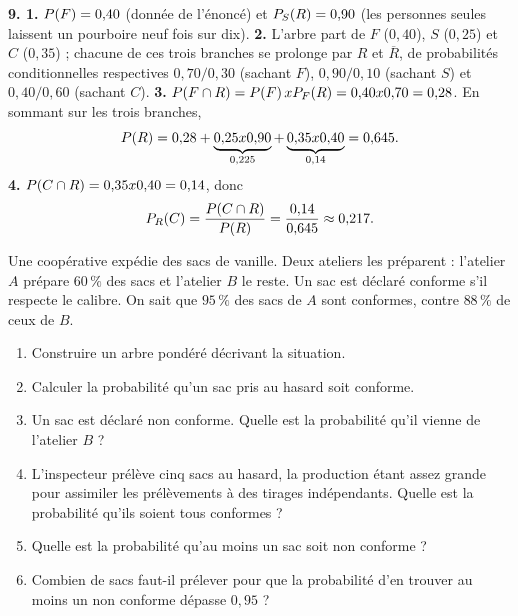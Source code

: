 \begin{corrige}[annales]
\textbf{9. 1.} $\proba{F} = 0{,}40$ (donnée de l'énoncé) et
$\probacond{R}{S} = 0{,}90$ (les personnes seules laissent un pourboire neuf
fois sur dix).
\textbf{2.} L'arbre part de $F$ ($0{,}40$), $S$ ($0{,}25$) et $C$ ($0{,}35$) ;
chacune de ces trois branches se prolonge par $R$ et $\overline{R}$, de
probabilités conditionnelles respectives $0{,}70/0{,}30$ (sachant $F$),
$0{,}90/0{,}10$ (sachant $S$) et $0{,}40/0{,}60$ (sachant $C$).
\textbf{3.} $\proba{F\cap R} = \proba{F}\times\probacond{R}{F}
= 0{,}40\times0{,}70 = 0{,}28$. En sommant sur les trois branches,
\[
  \proba{R} = 0{,}28 + \underbrace{0{,}25\times0{,}90}_{0{,}225}
  + \underbrace{0{,}35\times0{,}40}_{0{,}14} = 0{,}645 .
\]
\textbf{4.} $\proba{C\cap R} = 0{,}35\times0{,}40 = 0{,}14$, donc
\[
  \probacond{C}{R} = \frac{\proba{C\cap R}}{\proba{R}}
  = \frac{0{,}14}{0{,}645} \approx 0{,}217 .
\]
\end{corrige}

\begin{jecherche}
Une coopérative expédie des sacs de vanille. Deux ateliers les préparent :
l'atelier $A$ prépare $60\,\%$ des sacs et l'atelier $B$ le reste. Un sac est
déclaré conforme s'il respecte le calibre. On sait que $95\,\%$ des sacs de
$A$ sont conformes, contre $88\,\%$ de ceux de $B$.

\begin{enumerate}[label=\textbf{\arabic*.}, leftmargin=*, itemsep=0.3em]
  \item Construire un arbre pondéré décrivant la situation.
  \item Calculer la probabilité qu'un sac pris au hasard soit conforme.
  \item Un sac est déclaré non conforme. Quelle est la probabilité qu'il
        vienne de l'atelier $B$ ?
  \item L'inspecteur prélève cinq sacs au hasard, la production étant assez
        grande pour assimiler les prélèvements à des tirages indépendants.
        Quelle est la probabilité qu'ils soient tous conformes ?
  \item Quelle est la probabilité qu'au moins un sac soit non conforme ?
  \item Combien de sacs faut-il prélever pour que la probabilité d'en trouver
        au moins un non conforme dépasse $0{,}95$ ?
\end{enumerate}
\end{jecherche}


